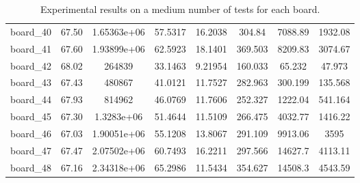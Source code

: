 \begin{table*}[!htbp]
\begin{center}
{\begin{tabular}{|c|c|cccc|cc|}
board\_40 & 67.50 & 1.65363e+06 & 57.5317 & 16.2038 & 304.84 & 7088.89 & 1932.08 \\
board\_41 & 67.60 & 1.93899e+06 & 62.5923 & 18.1401 & 369.503 & 8209.83 & 3074.67 \\
board\_42 & 68.02 & 264839 & 33.1463 & 9.21954 & 160.033 & 65.232 & 47.973 \\
board\_43 & 67.43 & 480867 & 41.0121 & 11.7527 & 282.963 & 300.199 & 135.568 \\
board\_44 & 67.93 & 814962 & 46.0769 & 11.7606 & 252.327 & 1222.04 & 541.164 \\
board\_45 & 67.30 & 1.3283e+06 & 51.4644 & 11.5109 & 266.475 & 4032.77 & 1416.22 \\
board\_46 & 67.03 & 1.90051e+06 & 55.1208 & 13.8067 & 291.109 & 9913.06 & 3595 \\
board\_47 & 67.47 & 2.07502e+06 & 60.7493 & 16.2211 & 297.566 & 14627.7 & 4113.11 \\
board\_48 & 67.16 & 2.34318e+06 & 65.2986 & 11.5434 & 354.627 & 14508.3 & 4543.59 \\
\hline
\end{tabular}
}
\caption{
  \label{tab:exp_board_medium_tests}
  Experimental results on a medium number of tests for each board.
}
\end{center}
\end{table*}


